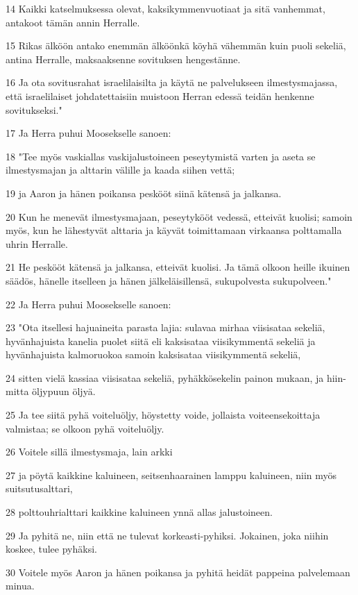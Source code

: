 \par 14 Kaikki katselmuksessa olevat, kaksikymmenvuotiaat ja sitä vanhemmat, antakoot tämän annin Herralle.
\par 15 Rikas älköön antako enemmän älköönkä köyhä vähemmän kuin puoli sekeliä, antina Herralle, maksaaksenne sovituksen hengestänne.
\par 16 Ja ota sovitusrahat israelilaisilta ja käytä ne palvelukseen ilmestysmajassa, että israelilaiset johdatettaisiin muistoon Herran edessä teidän henkenne sovitukseksi."
\par 17 Ja Herra puhui Moosekselle sanoen:
\par 18 "Tee myös vaskiallas vaskijalustoineen peseytymistä varten ja aseta se ilmestysmajan ja alttarin välille ja kaada siihen vettä;
\par 19 ja Aaron ja hänen poikansa peskööt siinä kätensä ja jalkansa.
\par 20 Kun he menevät ilmestysmajaan, peseytykööt vedessä, etteivät kuolisi; samoin myös, kun he lähestyvät alttaria ja käyvät toimittamaan virkaansa polttamalla uhrin Herralle.
\par 21 He peskööt kätensä ja jalkansa, etteivät kuolisi. Ja tämä olkoon heille ikuinen säädös, hänelle itselleen ja hänen jälkeläisillensä, sukupolvesta sukupolveen."
\par 22 Ja Herra puhui Moosekselle sanoen:
\par 23 "Ota itsellesi hajuaineita parasta lajia: sulavaa mirhaa viisisataa sekeliä, hyvänhajuista kanelia puolet siitä eli kaksisataa viisikymmentä sekeliä ja hyvänhajuista kalmoruokoa samoin kaksisataa viisikymmentä sekeliä,
\par 24 sitten vielä kassiaa viisisataa sekeliä, pyhäkkösekelin painon mukaan, ja hiin-mitta öljypuun öljyä.
\par 25 Ja tee siitä pyhä voiteluöljy, höystetty voide, jollaista voiteensekoittaja valmistaa; se olkoon pyhä voiteluöljy.
\par 26 Voitele sillä ilmestysmaja, lain arkki
\par 27 ja pöytä kaikkine kaluineen, seitsenhaarainen lamppu kaluineen, niin myös suitsutusalttari,
\par 28 polttouhrialttari kaikkine kaluineen ynnä allas jalustoineen.
\par 29 Ja pyhitä ne, niin että ne tulevat korkeasti-pyhiksi. Jokainen, joka niihin koskee, tulee pyhäksi.
\par 30 Voitele myös Aaron ja hänen poikansa ja pyhitä heidät pappeina palvelemaan minua.
